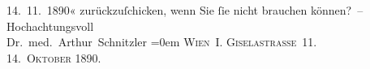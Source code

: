 \begin{ledgroupsized}[t]{13cm}
{{{                    14. 11. 1890}}}\label{K_L00006_1h}« zurückzuſchicken, wenn Sie ſie nicht
               brauchen können? –\pend
           \pstart
           Hochachtungsvoll{\\[\baselineskip]}\spacefill\mbox{Dr. med. Arthur Schnitzler}\pend
           \leftskip=0em{}\pstart
           \noindent{}\textsc{Wien I. Giselastraße 11.}{\\}\textsc{14. Oktober 1890}.\pend
                     \endnumbering{}\end{ledgroupsized}  \newcommand{\dateiname}{L00006}\newcommand{\titel}{Arthur Schnitzler an Wilhelm Bölsche, 14. 10. 1890}\newcommand{\editorInnen}{Martin Anton Müller und Gerd-Hermann Susen}
            \footnotesize
\begin{ledgroupsized}[t]{11.5cm}
\end{ledgroupsized}
         
      